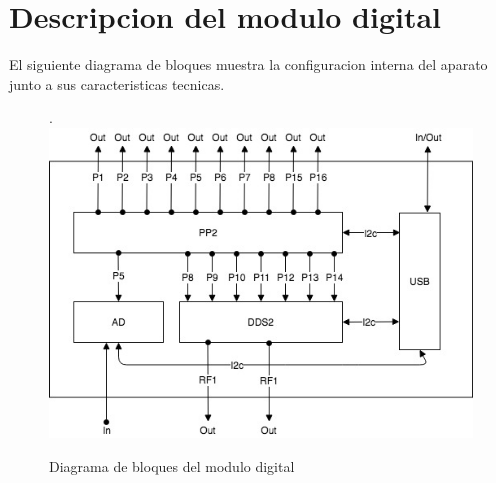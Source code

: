 \section{Descripcion del modulo digital}

El siguiente diagrama de bloques muestra la configuracion interna del aparato junto a sus caracteristicas tecnicas.

\begin{figure}[!htb].
    \includegraphics[width=\linewidth]{../figures/d6.jpg}
    \caption{Diagrama de bloques del modulo digital}
    \label{fig:d6}
\end{figure}


\newpage
